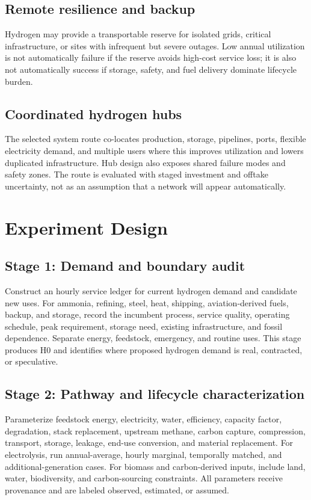 \documentclass[conference]{IEEEtran}
\begin{document}
\subsection{Remote resilience and backup}
Hydrogen may provide a transportable reserve for isolated grids, critical infrastructure, or sites with infrequent but severe outages. Low annual utilization is not automatically failure if the reserve avoids high-cost service loss; it is also not automatically success if storage, safety, and fuel delivery dominate lifecycle burden.

\subsection{Coordinated hydrogen hubs}
The selected system route co-locates production, storage, pipelines, ports, flexible electricity demand, and multiple users where this improves utilization and lowers duplicated infrastructure. Hub design also exposes shared failure modes and safety zones. The route is evaluated with staged investment and offtake uncertainty, not as an assumption that a network will appear automatically.

\section{Experiment Design}
\label{sec:design}
\subsection{Stage 1: Demand and boundary audit}
Construct an hourly service ledger for current hydrogen demand and candidate new uses. For ammonia, refining, steel, heat, shipping, aviation-derived fuels, backup, and storage, record the incumbent process, service quality, operating schedule, peak requirement, storage need, existing infrastructure, and fossil dependence. Separate energy, feedstock, emergency, and routine uses. This stage produces H0 and identifies where proposed hydrogen demand is real, contracted, or speculative.

\subsection{Stage 2: Pathway and lifecycle characterization}
Parameterize feedstock energy, electricity, water, efficiency, capacity factor, degradation, stack replacement, upstream methane, carbon capture, compression, transport, storage, leakage, end-use conversion, and material replacement. For electrolysis, run annual-average, hourly marginal, temporally matched, and additional-generation cases. For biomass and carbon-derived inputs, include land, water, biodiversity, and carbon-sourcing constraints. All parameters receive provenance and are labeled observed, estimated, or assumed.
\end{document}
